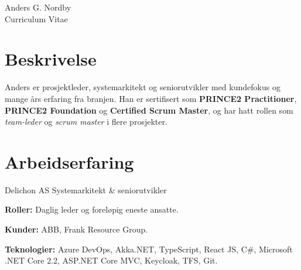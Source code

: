 \documentclass[10pt]{article} %
\begin{document}
\begin{paracol}{2} %


\parbox[top][0.12\textheight][c]{\linewidth}{ %
	\vspace{-0.04\textheight} %
	\centering %
	{\sffamily\Huge Anders G. Nordby}\\\medskip %
	{\Huge\color{headings}\cvtextfont Curriculum Vitae}
}


\section{Beskrivelse}

Anders er prosjektleder, systemarkitekt og seniorutvikler med kundefokus og mange års erfaring fra branjen.
Han er sertifisert som \textbf{PRINCE2 Practitioner}, \textbf{PRINCE2 Foundation} og \textbf{Certified Scrum Master}, og 
har hatt rollen som \textit{team-leder} og \textit{scrum master} i flere prosjekter. 


\section{Arbeidserfaring} 

{}
{Delichon AS} 
{Systemarkitekt \& seniorutvikler} 
{\textbf{Roller:} Daglig leder og foreløpig eneste ansatte.

\textbf{Kunder:} ABB, Frank Resource Group.

\textbf{Teknologier:} Azure DevOps, Akka.NET, TypeScript, React JS, C\#, Microsoft .NET Core 2.2, ASP.NET Core MVC, Keycloak, TFS, Git.
} 


\end{paracol}
\end{document}
